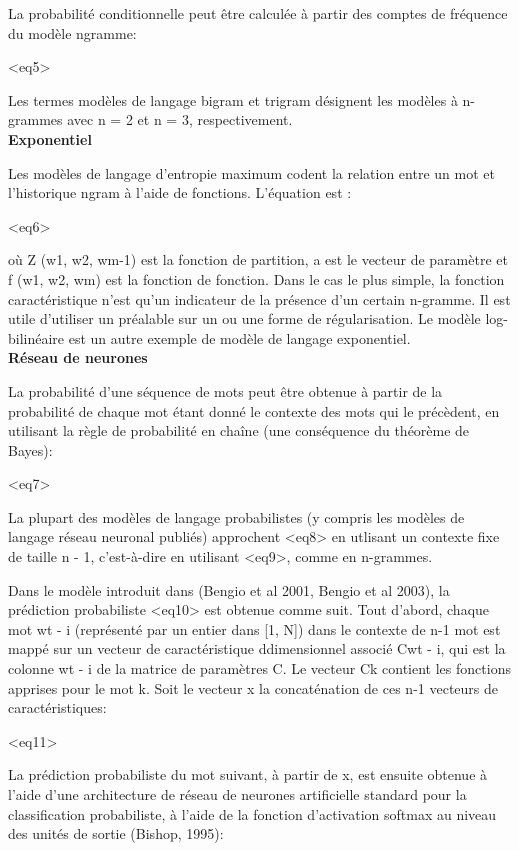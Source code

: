 \documentclass[a4paper, 12pt]{book}
\begin{document}
La probabilité conditionnelle peut être calculée à partir des comptes de fréquence du modèle ngramme:

<eq5>

Les termes modèles de langage bigram et trigram désignent les modèles à n-grammes avec n = 2 et n = 3, respectivement.\\

\textbf{Exponentiel}

Les modèles de langage d'entropie maximum codent la relation entre un mot et l'historique ngram à l'aide de fonctions. L'équation est :

<eq6>

où Z (w1, w2, wm-1) est la fonction de partition, a est le vecteur de paramètre et f (w1, w2, wm) est la fonction de fonction. Dans le cas le plus simple, la fonction caractéristique n'est qu'un indicateur de la présence d'un certain n-gramme. Il est utile d’utiliser un préalable sur un ou une forme de régularisation. Le modèle log-bilinéaire est un autre exemple de modèle de langage exponentiel.\\

\textbf{Réseau de neurones}

La probabilité d'une séquence de mots peut être obtenue à partir de la probabilité de chaque mot étant donné le contexte des mots qui le précèdent, en utilisant la règle de probabilité en chaîne (une conséquence du théorème de Bayes):

<eq7>

La plupart des modèles de langage probabilistes (y compris les modèles de langage réseau neuronal publiés) approchent <eq8> en utlisant un contexte fixe de taille n - 1, c'est-à-dire en utilisant <eq9>, comme en n-grammes.

Dans le modèle introduit dans (Bengio et al 2001, Bengio et al 2003), la prédiction probabiliste <eq10> est obtenue comme suit. Tout d'abord, chaque mot wt - i (représenté par un entier dans [1, N]) dans le contexte de n-1 mot est mappé sur un vecteur de caractéristique ddimensionnel associé Cwt - i, qui est la colonne wt - i de la matrice de paramètres C. Le vecteur Ck contient les fonctions apprises pour le mot k. Soit le vecteur x la concaténation de ces n-1 vecteurs de caractéristiques:

<eq11>

La prédiction probabiliste du mot suivant, à partir de x, est ensuite obtenue à l'aide d'une architecture de réseau de neurones artificielle standard pour la classification probabiliste, à l'aide de la fonction d'activation softmax au niveau des unités de sortie (Bishop, 1995):
\end{document}
